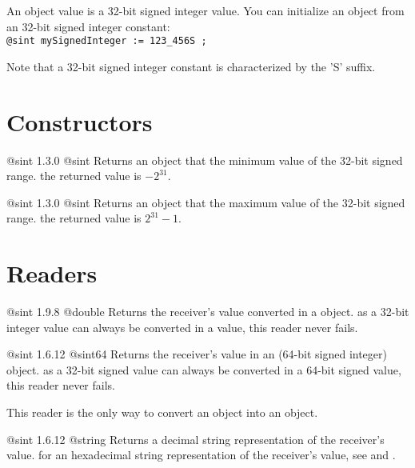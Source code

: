 

An  object value is a 32-bit signed integer value. You can initialize an  object from an 32-bit signed integer constant:\\

\texttt{@sint mySignedInteger := 123\_456S ;}

Note that a 32-bit signed integer constant is characterized by the 'S' suffix.


\section{Constructors}

{@sint}
{1.3.0}
{@sint}
{Returns an  object that the minimum value of the 32-bit signed range.}
{the returned value is $-2^{31}$.}





{@sint}
{1.3.0}
{@sint}
{Returns an  object that the maximum value of the 32-bit signed range.}
{the returned value is $2^{31}-1$.}



\section{Readers}

{@sint}
{1.9.8}
{@double}
{Returns the receiver's value converted in a  object.}
{as a 32-bit integer value can always be converted in a  value, this reader never fails.}





{@sint}
{1.6.12}
{@sint64}
{Returns the receiver's value in an  (64-bit signed integer) object.}
{as a 32-bit signed value can always be converted in a 64-bit signed value, this reader never fails.}

This reader is the only way to convert an  object into an  object.





{@sint}
{1.6.12}
{@string}
{Returns a decimal string representation of the receiver's value.}
{for an hexadecimal string representation of the receiver's value, see  and .}







